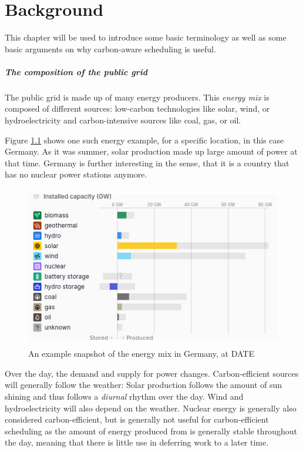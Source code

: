 \chapter{Background}

This chapter will be used to introduce some basic terminology as well as some basic arguments on why carbon-aware scheduling is useful.

\paragraph{The composition of the public grid}
The public grid is made up of many energy producers. This \emph{energy mix} is composed of different sources: low-carbon technologies like solar, wind, or hydroelectricity and carbon-intensive sources like coal, gas, or oil. 

Figure \ref{fig:energy_mix} shows one such energy example, for a specific location, in this case Germany.
As it was summer, solar production made up large amount of power at that time. 
Germany is further interesting in the sense, that it is a country that has no nuclear power stations anymore.

\begin{figure}
    \includegraphics[width=\linewidth, height=200pt]{images/2_background2024-08-20-15-28-19.png}
    \caption[short]{An example snapshot of the energy mix in Germany, at DATE}
    \label{fig:energy_mix}
\end{figure}

Over the day, the demand and supply for power changes. Carbon-efficient sources will generally follow the weather: Solar production follows the amount of sun shining and thus follows a \emph{diurnal} rhythm over the day. Wind and hydroelectricity will also depend on the weather. 
Nuclear energy is generally also considered carbon-efficient, but is generally not useful for carbon-efficient scheduling as the amount of energy produced from is generally stable throughout  the day, meaning that there is little use in deferring work to a later time. 

